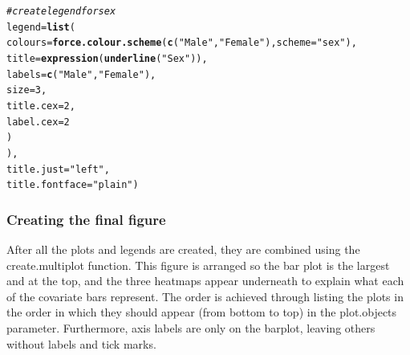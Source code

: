\documentclass[letterpaper]{report}\usepackage[]{graphicx}\usepackage[]{color}
\makeatletter
\newcommand{\hlnum}[1]{\textcolor[rgb]{0.686,0.059,0.569}{#1}}%
\newcommand{\hlstr}[1]{\textcolor[rgb]{0.192,0.494,0.8}{#1}}%
\newcommand{\hlcom}[1]{\textcolor[rgb]{0.678,0.584,0.686}{\textit{#1}}}%
\newcommand{\hlstd}[1]{\textcolor[rgb]{0.345,0.345,0.345}{#1}}%
\newcommand{\hlkwc}[1]{\textcolor[rgb]{0.333,0.667,0.333}{#1}}%
\newcommand{\hlkwd}[1]{\textcolor[rgb]{0.737,0.353,0.396}{\textbf{#1}}}%
\newenvironment{kframe}{%
 \def\at@end@of@kframe{}%
 \ifinner\ifhmode%
  \def\at@end@of@kframe{\end{minipage}}%
  \begin{minipage}{\columnwidth}%
 \fi\fi%
 \def\FrameCommand##1{\hskip\@totalleftmargin \hskip-\fboxsep
 \colorbox{shadecolor}{##1}\hskip-\fboxsep
     \hskip-\linewidth \hskip-\@totalleftmargin \hskip\columnwidth}%
 \MakeFramed {\advance\hsize-\width
   \@totalleftmargin\z@ \linewidth\hsize
   \@setminipage}}%
 {\par\unskip\endMakeFramed%
 \at@end@of@kframe}
\newenvironment{knitrout}{}{} %
\makeatother
\begin{document}
\begin{knitrout}
\begin{kframe}
\begin{alltt}
       \hlcom{# create legend for sex}
       \hlkwc{legend} \hlstd{=} \hlkwd{list}\hlstd{(}
               \hlkwc{colours} \hlstd{=} \hlkwd{force.colour.scheme}\hlstd{(}\hlkwd{c}\hlstd{(}\hlstr{"Male"}\hlstd{,} \hlstr{"Female"}\hlstd{),}\hlkwc{scheme} \hlstd{=} \hlstr{"sex"}\hlstd{),}
               \hlkwc{title} \hlstd{=} \hlkwd{expression}\hlstd{(}\hlkwd{underline}\hlstd{(}\hlstr{"Sex"}\hlstd{)),}
               \hlkwc{labels} \hlstd{=} \hlkwd{c}\hlstd{(}\hlstr{"Male"}\hlstd{,} \hlstr{"Female"}\hlstd{),}
               \hlkwc{size} \hlstd{=} \hlnum{3}\hlstd{,}
               \hlkwc{title.cex} \hlstd{=} \hlnum{2}\hlstd{,}
               \hlkwc{label.cex} \hlstd{=} \hlnum{2}
               \hlstd{)}
       \hlstd{),}
       \hlkwc{title.just} \hlstd{=} \hlstr{"left"}\hlstd{,}
       \hlkwc{title.fontface} \hlstd{=} \hlstr{"plain"}\hlstd{)}
\end{alltt}
\end{kframe}
\end{knitrout}

\subsubsection{Creating the final figure}
After all the plots and legends are created, they are combined using the create.multiplot function. This figure is arranged so the bar plot is the largest and at the top, and the three heatmaps appear underneath to explain what each of the covariate bars represent. The order is achieved through listing the plots in the order in which they should appear (from bottom to top) in the plot.objects parameter. Furthermore, axis labels are only on the barplot, leaving others without labels and tick marks.
\end{document}
